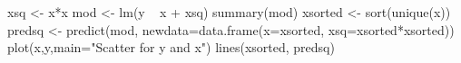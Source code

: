 \begin{Schunk}
\begin{Sinput}
 xsq <- x*x
 mod <- lm(y ~ x + xsq)
 summary(mod)
 xsorted <- sort(unique(x))
 predsq <- predict(mod, newdata=data.frame(x=xsorted, xsq=xsorted*xsorted))
 plot(x,y,main="Scatter for y and x")
 lines(xsorted, predsq)
\end{Sinput}
\end{Schunk}
